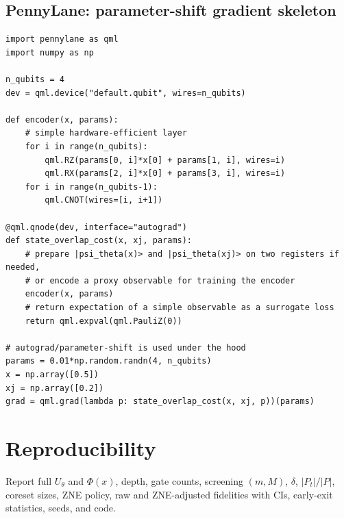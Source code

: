 \documentclass[11pt]{article}
\begin{document}
\subsection*{PennyLane: parameter-shift gradient skeleton}
\begin{lstlisting}[style=code,caption={Parameter-shift training skeleton},label={lst:psr}]
import pennylane as qml
import numpy as np

n_qubits = 4
dev = qml.device("default.qubit", wires=n_qubits)

def encoder(x, params):
    # simple hardware-efficient layer
    for i in range(n_qubits):
        qml.RZ(params[0, i]*x[0] + params[1, i], wires=i)
        qml.RX(params[2, i]*x[0] + params[3, i], wires=i)
    for i in range(n_qubits-1):
        qml.CNOT(wires=[i, i+1])

@qml.qnode(dev, interface="autograd")
def state_overlap_cost(x, xj, params):
    # prepare |psi_theta(x)> and |psi_theta(xj)> on two registers if needed,
    # or encode a proxy observable for training the encoder
    encoder(x, params)
    # return expectation of a simple observable as a surrogate loss
    return qml.expval(qml.PauliZ(0))

# autograd/parameter-shift is used under the hood
params = 0.01*np.random.randn(4, n_qubits)
x = np.array([0.5])
xj = np.array([0.2])
grad = qml.grad(lambda p: state_overlap_cost(x, xj, p))(params)
\end{lstlisting}

\section{Reproducibility}
Report full $U_\theta$ and $\Phi(x)$, depth, gate counts, screening $(m,M)$, $\delta$, $|P_t|/|P|$, coreset sizes, ZNE policy, raw and ZNE-adjusted fidelities with CIs, early-exit statistics, seeds, and code.



\end{document}
